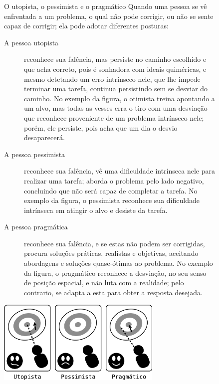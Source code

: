 \begin{figure}[!h]
\begin{elaboracion}{O utopista{,} o pessimista e o pragmático}
Quando uma pessoa se vê enfrentada a um problema, 
o qual não pode corrigir,
ou não se sente capaz de corrigir; ela pode adotar diferentes posturas:
\begin{description}
\item[A pessoa utopista] reconhece sua falência, mas persiste no caminho  escolhido
e que acha correto, pois é sonhadora com ideais quiméricas, 
e mesmo detetando um erro intrínseco nele, que lhe impede terminar uma tarefa,
continua persistindo sem se desviar do caminho.
No exemplo da figura, o otimista treina apontando a um alvo, 
mas todas as vesses erra o tiro com uma desviação que reconhece proveniente de um problema intrínseco nele;
porém, ele persiste, pois acha que um dia o desvio desaparecerá.
\item[A pessoa pessimista] reconhece sua falência, 
vê uma dificuldade intrínseca nele para realizar uma tarefa; aborda o problema pelo lado negativo,
concluindo que não será capaz de completar a tarefa.
No exemplo da figura, o pessimista reconhece sua dificuldade intrínseca em atingir o alvo
e desiste da tarefa. 
\item[A pessoa pragmática] reconhece sua falência, e se estas não podem ser corrigidas,
procura soluções práticas, realistas e objetivas, 
aceitando abordagens e soluções quase-ótimas ao problema.
No exemplo da figura, o pragmático reconhece a desviação,
 no seu senso de posição espacial, e não luta com a realidade; pelo contrario, se adapta a esta 
para obter a resposta desejada. 
\end{description}
\begin{center}
    \includegraphics[width=0.7\textwidth]{chapters/cap-body-control/problema-generico-completo.eps}
\end{center}
\end{elaboracion}
\end{figure}


